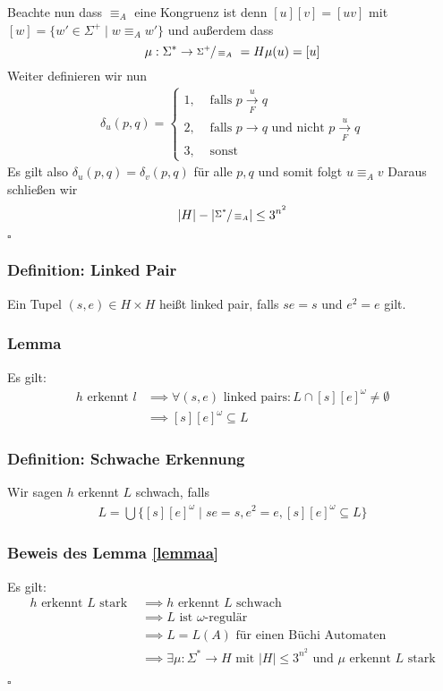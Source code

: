 \documentclass[12pt, german]{article}
\def\ttou#1#2{ \overset{#1}{\underset{#2}{\longrightarrow}}}
\newcommand{\sigstern}{\Sigma^\ast}
\newcommand{\pom}{^{\omega}}
\newcommand{\bewiesen}{
	
	\begin{flushright}
		$\square$  \\
\end{flushright}}
\begin{document}
	Beachte nun dass $\equiv_A$ eine Kongruenz ist denn $[u][v] = [uv]$ mit $[w] = \{w' \in \Sigma^+ \mid w \equiv_A w'\}$ und au\ss erdem dass $$\mu: \sigstern \to \sfrac{\Sigma^+}{\equiv_A}  = H\mu(u) = [u]$$ Weiter definieren wir nun 
	\begin{align*}
	\delta_u(p,q) = 
		\begin{cases}
		1, &\text{ falls } p \ttou{u}{F} q \\
		2, &\text{ falls } p \longrightarrow q \text{ und nicht } p \ttou{u}{F} q \\
		3, &\text{ sonst}
		\end{cases}
	\end{align*}
	Es gilt also $\delta_u(p, q) = \delta_v(p, q)$ für alle $p, q$ und somit folgt $u \equiv_A v$
	Daraus schlie\ss en wir $$|H| - |\sfrac{\sigstern}{\equiv_A}| \leq 3^{n^2}$$ 
	\bewiesen
	
\subsubsection{Definition: Linked Pair}
	Ein Tupel $(s, e) \in H \times H$ hei\ss t linked pair, falls $se = s$ und $e^2 = e$ gilt.

\subsubsection{Lemma \label{lemmaa}}
	Es gilt: 
	\begin{align*}
		h \text{ erkennt } l &\implies \forall (s,e) \text{ linked pairs}: L \cap [s][e]\pom \not = \emptyset \\
		&\implies [s][e]\pom \subseteq L
	\end{align*}

\subsubsection{Definition:  Schwache Erkennung}
	Wir sagen $h$ erkennt $L$ schwach, falls
	\begin{align*}
		L = \bigcup \{[s][e]\pom \mid se = s, e^2 = e, [s][e]\pom \subseteq L\}
	\end{align*}

\subsubsection{Beweis des Lemma \ref{lemmaa}}
	Es gilt: 
	\begin{align*}
		h \text{ erkennt } L \text{ stark } &\implies h \text{ erkennt } L \text{ schwach } \\
		&\implies L \text{ ist $\omega$-regulär } \\
		&\implies L = L(A) \text{ für einen Büchi Automaten} \\
		&\implies \exists \mu: \sigstern \to H \text{ mit } |H| \leq 3^{n^2} \text{ und } \mu \text{ erkennt } L \text{ stark}
	\end{align*}
	\bewiesen
	
\end{document}
